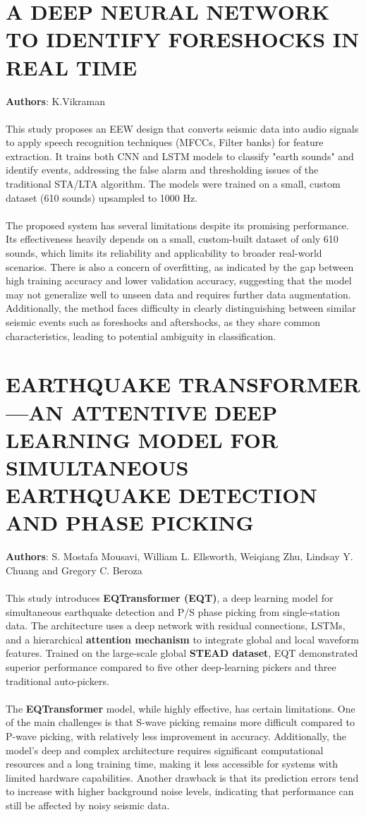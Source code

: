 \documentclass[a4paper,12pt]{report}
\begin{document}
\section{A DEEP NEURAL NETWORK TO IDENTIFY FORESHOCKS IN REAL TIME}
\label{sec:2.6}
\textbf{Authors}: K.Vikraman\\
\\
This study proposes an EEW design that converts seismic data into audio signals to apply speech recognition techniques (MFCCs, Filter banks) for feature extraction. It trains both CNN and LSTM models to classify "earth sounds" and identify events, addressing the false alarm and thresholding issues of the traditional STA/LTA algorithm. The models were trained on a small, custom dataset (610 sounds) upsampled to 1000 Hz.
\\
\\
The proposed system has several limitations despite its promising performance. Its effectiveness heavily depends on a small, custom-built dataset of only 610 sounds, which limits its reliability and applicability to broader real-world scenarios. There is also a concern of overfitting, as indicated by the gap between high training accuracy and lower validation accuracy, suggesting that the model may not generalize well to unseen data and requires further data augmentation. Additionally, the method faces difficulty in clearly distinguishing between similar seismic events such as foreshocks and aftershocks, as they share common characteristics, leading to potential ambiguity in classification.
\section{EARTHQUAKE TRANSFORMER—AN ATTENTIVE DEEP LEARNING MODEL FOR SIMULTANEOUS EARTHQUAKE DETECTION AND PHASE PICKING}
\label{sec:2.7}
\textbf{Authors}: S. Mostafa Mousavi, William L. Ellsworth, Weiqiang Zhu, Lindsay Y. Chuang and Gregory C. Beroza\\
\\
This study introduces \textbf{EQTransformer (EQT)}, a deep learning model for simultaneous earthquake detection and P/S phase picking from single-station data. The architecture uses a deep network with residual connections, LSTMs, and a hierarchical \textbf{attention mechanism} to integrate global and local waveform features. Trained on the large-scale global \textbf{STEAD dataset}, EQT demonstrated superior performance compared to five other deep-learning pickers and three traditional auto-pickers.
\\
\\
The \textbf{EQTransformer} model, while highly effective, has certain limitations. One of the main challenges is that S-wave picking remains more difficult compared to P-wave picking, with relatively less improvement in accuracy. Additionally, the model’s deep and complex architecture requires significant computational resources and a long training time, making it less accessible for systems with limited hardware capabilities. Another drawback is that its prediction errors tend to increase with higher background noise levels, indicating that performance can still be affected by noisy seismic data.
\end{document}
